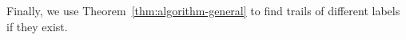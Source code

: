 \documentclass[a4paper, 12pt]{article}
\let\leq\leqslant
\newcommand{\RMM}[1]{\textcolor{orange}{RM: #1}}
\newcommand{\CMin}[1]{\todo[inline,bordercolor=white,color=Magenta,backgroundcolor=CornflowerBlue!40,textcolor=black,size=\footnotesize]{\textsf{CM: #1}}}
\newcommand{\DK}[1]{\textcolor{blue}{DK: #1}}
\begin{document}


Finally, we use Theorem~\ref{thm:algorithm-general} to find trails of different labels if they exist.
\end{document}
